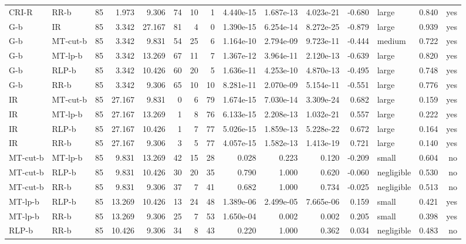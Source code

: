 \begin{table}[htbp]
\begin{tabular}{llrrrrrrrrrrlrr}
CRI-R & RR-b & 85 & 1.973 & 9.306 & 74 & 10 & 1 & 4.440e-15 & 1.687e-13 & 4.023e-21 & -0.680 & large & 0.840 & yes \\
G-b & IR & 85 & 3.342 & 27.167 & 81 & 4 & 0 & 1.390e-15 & 6.254e-14 & 8.272e-25 & -0.879 & large & 0.939 & yes \\
G-b & MT-cut-b & 85 & 3.342 & 9.831 & 54 & 25 & 6 & 1.164e-10 & 2.794e-09 & 9.723e-11 & -0.444 & medium & 0.722 & yes \\
G-b & MT-lp-b & 85 & 3.342 & 13.269 & 67 & 11 & 7 & 1.367e-12 & 3.964e-11 & 2.120e-13 & -0.639 & large & 0.820 & yes \\
G-b & RLP-b & 85 & 3.342 & 10.426 & 60 & 20 & 5 & 1.636e-11 & 4.253e-10 & 4.870e-13 & -0.495 & large & 0.748 & yes \\
G-b & RR-b & 85 & 3.342 & 9.306 & 65 & 10 & 10 & 8.281e-11 & 2.070e-09 & 5.154e-11 & -0.551 & large & 0.776 & yes \\
IR & MT-cut-b & 85 & 27.167 & 9.831 & 0 & 6 & 79 & 1.674e-15 & 7.030e-14 & 3.309e-24 & 0.682 & large & 0.159 & yes \\
IR & MT-lp-b & 85 & 27.167 & 13.269 & 1 & 8 & 76 & 6.133e-15 & 2.208e-13 & 1.032e-21 & 0.557 & large & 0.222 & yes \\
IR & RLP-b & 85 & 27.167 & 10.426 & 1 & 7 & 77 & 5.026e-15 & 1.859e-13 & 5.228e-22 & 0.672 & large & 0.164 & yes \\
IR & RR-b & 85 & 27.167 & 9.306 & 3 & 5 & 77 & 4.057e-15 & 1.582e-13 & 1.413e-19 & 0.721 & large & 0.140 & yes \\
MT-cut-b & MT-lp-b & 85 & 9.831 & 13.269 & 42 & 15 & 28 & 0.028 & 0.223 & 0.120 & -0.209 & small & 0.604 & no \\
MT-cut-b & RLP-b & 85 & 9.831 & 10.426 & 30 & 20 & 35 & 0.790 & 1.000 & 0.620 & -0.060 & negligible & 0.530 & no \\
MT-cut-b & RR-b & 85 & 9.831 & 9.306 & 37 & 7 & 41 & 0.682 & 1.000 & 0.734 & -0.025 & negligible & 0.513 & no \\
MT-lp-b & RLP-b & 85 & 13.269 & 10.426 & 13 & 24 & 48 & 1.389e-06 & 2.499e-05 & 7.665e-06 & 0.159 & small & 0.421 & yes \\
MT-lp-b & RR-b & 85 & 13.269 & 9.306 & 25 & 7 & 53 & 1.650e-04 & 0.002 & 0.002 & 0.205 & small & 0.398 & yes \\
RLP-b & RR-b & 85 & 10.426 & 9.306 & 34 & 8 & 43 & 0.220 & 1.000 & 0.362 & 0.034 & negligible & 0.483 & no \\
\bottomrule
\end{tabular}
\end{table}
